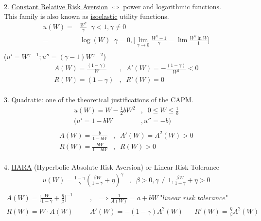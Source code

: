 \documentclass[
14pt,notheorems,hyperref={pdfauthor=whatever}
]{beamer}
\begin{document}
\begin{frame}
2. \underline{Constant Relative Risk Aversion} $\iff$ power and logarithmic functions.\\
This family is also known as \underline{isoelastic} utility functions.\\
\begin{align*}
    u(W) =& \frac{W^{\gamma}}{\gamma}\;\;\gamma<1,\gamma\neq0\\
    =& \log(W)\;\;\gamma=0,\Bigg[\lim_{\gamma \to 0} \frac{W^\gamma-1}{\gamma}=\lim\frac{W^\gamma \ln{W}}{1}\Bigg]\\
\end{align*}
($u'=W^{\gamma-1}; u'' = (\gamma-1)W^{\gamma-2}$)\\
\begin{align*}
    A(W) = \frac{(1-\gamma)}{W}&,\;\;A'(W) = -\frac{(1-\gamma)}{W^2}<0\\
    R(W) = (1-\gamma)&,\;\;R'(W) = 0\\
\end{align*}
\end{frame}

\begin{frame}
3. \underline{Quadratic}: one of the theoretical justifications of the CAPM.\\
\hfill \break
\begin{align*}
    u(W) = W-\frac{1}{2}bW^2 &,\;\;0\leq W \leq \frac{1}{b}\\
    \Bigg(u' = 1-bW&, u''=-b\Bigg)\\
\end{align*}
\begin{align*}
    A(W) = \frac{b}{1-bW}&,\;\;A'(W) = A^2(W)>0\\
    R(W) = \frac{bW}{1-bW}&,\;\;R(W) > 0\\
\end{align*}
\end{frame}

\begin{frame}
4. \underline{HARA} (Hyperbolic Absolute Risk Aversion) or Linear Risk Tolerance\\
\hfill \break
\begin{align*}
    u(W) = \frac{1-\gamma}{\gamma}(\frac{\beta W}{1-\gamma}+\eta)^\gamma &,\;\;\beta>0,\gamma\neq1,\frac{\beta W}{1-\gamma}+\eta>0\\
\end{align*}
\begin{align*}
    A(W) = \Bigg[\frac{W}{1-\gamma}+\frac{\eta}{\beta}\Bigg]^{-1}&,\;\;\implies \frac{1}{A(W)} = a+bW \;\textit{"linear risk tolerance"}\\
    R(W) = W\cdot A(W) \;\;\;\;\;\; &A'(W)=-(1-\gamma)A^2(W) \;\;\;\;\;\; R'(W)=\frac{\eta}{\beta}A^2(W)\\
\end{align*}
\end{frame}
\end{document}
